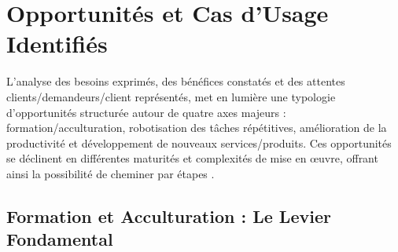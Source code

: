 \section{Opportunités et Cas d'Usage Identifiés}

L'analyse des besoins exprimés, des bénéfices constatés et des attentes clients/demandeurs/client représentés, met en lumière une typologie d'opportunités structurée autour de quatre axes majeurs : formation/acculturation, robotisation des tâches répétitives, amélioration de la productivité et développement de nouveaux services/produits. Ces opportunités se déclinent en différentes maturités et complexités de mise en œuvre, offrant ainsi la possibilité de cheminer par étapes \cite{moore2014crossing}.

\subsection{Formation et Acculturation : Le Levier Fondamental}

